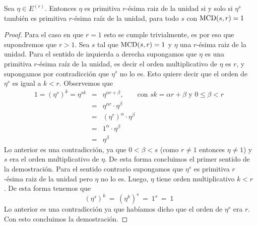 \begin{afirmacion}\label{afirmacion relacion primitivas}
Sea $\eta\in E^{(r)}$. Entonces $\eta$ es primitiva $r$-ésima raiz de la unidad si y solo si $\eta^s$ también es primitiva $r$-ésima raí­z de la unidad, para todo $s$ con ${\rm MCD}(s,r)=1$
\end{afirmacion}
\begin{proof}
Para el caso en que $r=1$ esto se cumple trivialmente, es por eso que supondremos que $r>1$. Sea $s$ tal que  ${\rm MCD}(s,r) = 1$ y $\eta$ una $r$-ésima raiz de la unidad. Para el sentido de izquierda a derecha supongamos que $\eta$ es una primitiva $r$-ésima raí­z de la unidad, es decir el orden multiplicativo de $\eta$ es $r$, y supongamos por contradicción que $\eta^s$ no lo es. Esto quiere decir que el orden de $\eta^s$ es igual a $k<r$. Observemos que 
\begin{eqnarray*}
	1 =  (\eta^{s})^{k}=\eta^{sk} &=& \eta^{\alpha r + \beta},\quad\quad\text{con $sk = \alpha r + \beta$ y $0\leq \beta<r$}\\
	&=&  \eta^{\alpha r}\cdot \eta^{\beta}\\
	&=& (\eta^{r})^{\alpha}\cdot \eta^{\beta}\\
	&=& 1^{\alpha}\cdot \eta^{\beta}\\
	&=& \eta^{\beta}
\end{eqnarray*} 
Lo anterior es una contradicción, ya que $0<\beta<s$ (como $r\neq 1$ entonces $\eta\neq 1$) y $s$ era el orden multiplicativo de $\eta$. De esta forma concluimos el primer sentido de la demostración. Para el sentido contrario supongamos que $\eta^s$ es primitiva $r$-ésima raiz de la unidad pero $\eta$ no lo es. Luego, $\eta$ tiene orden multiplicativo $k< r$. De esta forma tenemos que $$(\eta^{s})^k \ = \ (\eta^{k})^s \ = \ 1^s \ = \ 1$$
Lo anterior es una contradicción ya que habíamos dicho que el orden de $\eta^{s}$ era $r$. Con esto concluimos la demostración.
\end{proof} 
